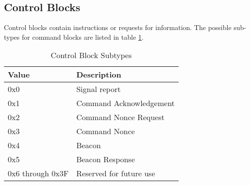 \subsection{Control Blocks}
Control blocks contain instructions or requests for information. The possible sub-types for command blocks are listed
in table \ref{table:control-subtypes}.

\begin{table}[H]
    \centering
    \begin{tabular}{@{}ll@{}}
        \toprule
        Value            & Description             \\
        \midrule
        0x0              & Signal report           \\
        0x1              & Command Acknowledgement \\
        0x2              & Command Nonce Request   \\
        0x3              & Command Nonce           \\
        0x4              & Beacon                  \\
        0x5              & Beacon Response         \\
        0x6 through 0x3F & Reserved for future use \\
        \bottomrule
    \end{tabular}
    \caption{Control Block Subtypes}
    \label{table:control-subtypes}
\end{table}



